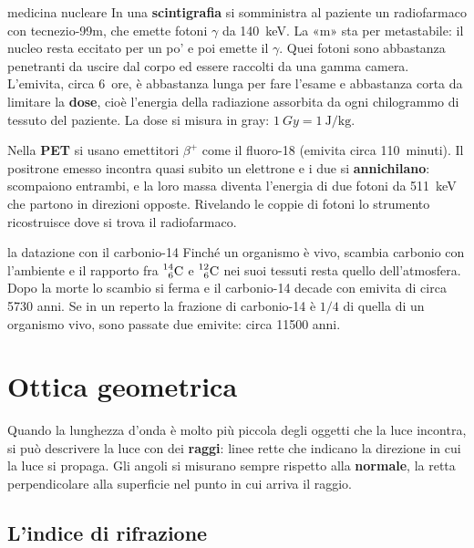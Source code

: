 \begin{applicazione}{medicina nucleare}
In una \textbf{scintigrafia} si somministra al paziente un radiofarmaco con tecnezio-99m, che emette fotoni $\gamma$ da \SI{140}{\kilo\electronvolt}. La «m» sta per metastabile: il nucleo resta eccitato per un po' e poi emette il $\gamma$. Quei fotoni sono abbastanza penetranti da uscire dal corpo ed essere raccolti da una gamma camera. L'emivita, circa \SI{6}{ore}, è abbastanza lunga per fare l'esame e abbastanza corta da limitare la \textbf{dose}, cioè l'energia della radiazione assorbita da ogni chilogrammo di tessuto del paziente. La dose si misura in gray: $\SI{1}{Gy} = \SI{1}{\joule\per\kilo\gram}$.

Nella \textbf{PET} si usano emettitori $\beta^+$ come il fluoro-18 (emivita circa \SI{110}{minuti}). Il positrone emesso incontra quasi subito un elettrone e i due si \textbf{annichilano}: scompaiono entrambi, e la loro massa diventa l'energia di due fotoni da \SI{511}{\kilo\electronvolt} che partono in direzioni opposte. Rivelando le coppie di fotoni lo strumento ricostruisce dove si trova il radiofarmaco.
\end{applicazione}

\begin{approfondimento}{la datazione con il carbonio-14}
Finché un organismo è vivo, scambia carbonio con l'ambiente e il rapporto fra $\prescript{14}{6}{\mathrm{C}}$ e $\prescript{12}{6}{\mathrm{C}}$ nei suoi tessuti resta quello dell'atmosfera. Dopo la morte lo scambio si ferma e il carbonio-14 decade con emivita di circa \num{5730} anni. Se in un reperto la frazione di carbonio-14 è $1/4$ di quella di un organismo vivo, sono passate due emivite: circa \num{11500} anni.
\end{approfondimento}

\section{Ottica geometrica}
\label{sec:ud7-ottica}

Quando la lunghezza d'onda è molto più piccola degli oggetti che la luce incontra, si può descrivere la luce con dei \textbf{raggi}: linee rette che indicano la direzione in cui la luce si propaga. Gli angoli si misurano sempre rispetto alla \textbf{normale}, la retta perpendicolare alla superficie nel punto in cui arriva il raggio.

\subsection{L'indice di rifrazione}

